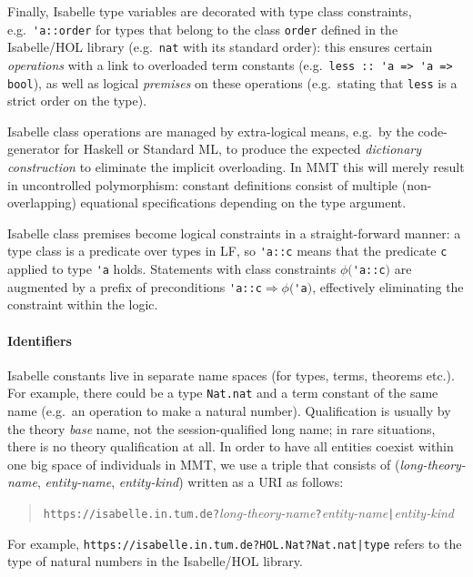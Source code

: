 Finally, Isabelle type variables are decorated with type class constraints,
e.g.\ \verb,'a::order, for types that belong to the class \verb,order,
defined in the Isabelle/HOL library (e.g.\ \verb,nat, with its
standard order): this ensures certain \emph{operations} with a link to
overloaded term constants (e.g.\ \verb,less :: 'a => 'a => bool,), as
well as logical \emph{premises} on these operations (e.g.\ stating
that \verb,less, is a strict order on the type).

Isabelle class operations are managed by extra-logical means, e.g.\ by
the code-generator for Haskell or Standard ML, to produce the expected
\emph{dictionary construction} to eliminate the implicit
overloading. In MMT this will merely result in uncontrolled
polymorphism: constant definitions consist of multiple
(non-overlapping) equational specifications depending on the type
argument.

Isabelle class premises become logical constraints in a
straight-forward manner: a type class is a predicate over types in LF,
so \verb,'a::c, means that the predicate \verb,c, applied to type
\verb,'a, holds. Statements with class constraints
$\phi($\verb,'a::c,$)$ are augmented by a prefix of preconditions
\verb,'a::c,${} \Longrightarrow \phi($\verb,'a,$)$, effectively
eliminating the constraint within the logic.

\paragraph{Identifiers}
Isabelle constants live in separate name spaces (for types, terms,
theorems etc.).  For example, there could be a type \verb,Nat.nat, and
a term constant of the same name (e.g.\ an operation to make a natural
number). Qualification is usually by the theory \emph{base} name, not
the session-qualified long name; in rare situations, there is no
theory qualification at all. In order to have all entities coexist
within one big space of individuals in MMT, we use a triple that
consists of (\emph{long-theory-name}, \emph{entity-name},
\emph{entity-kind}) written as a URI as follows:

\begin{quote}
\texttt{https://isabelle.in.tum.de?}\emph{long-theory-name}\texttt{?}\emph{entity-name}\texttt{|}\emph{entity-kind}
\end{quote}

\noindent For example, \texttt{https://isabelle.in.tum.de?HOL.Nat?Nat.nat|type} refers to the type of natural numbers in the Isabelle/HOL library.


